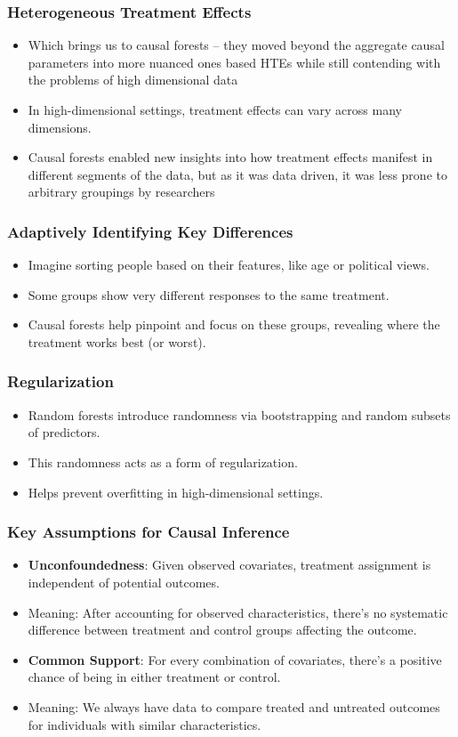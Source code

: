 \documentclass{beamer}
\begin{document}
\begin{frame}
\frametitle{Heterogeneous Treatment Effects}
\begin{itemize}
\item Which brings us to causal forests -- they moved beyond the aggregate causal parameters into more nuanced ones based HTEs while still contending with the problems of high dimensional data

    \item In high-dimensional settings, treatment effects can vary across many dimensions.
    \item Causal forests enabled new insights into how treatment effects manifest in different segments of the data, but as it was data driven, it was less prone to arbitrary groupings by researchers
\end{itemize}
\end{frame}

\begin{frame}
\frametitle{Adaptively Identifying Key Differences}
\begin{itemize}
    \item Imagine sorting people based on their features, like age or political views.
    \item Some groups show very different responses to the same treatment.
    \item Causal forests help pinpoint and focus on these groups, revealing where the treatment works best (or worst).
\end{itemize}
\end{frame}

\begin{frame}
\frametitle{Regularization}
\begin{itemize}
    \item Random forests introduce randomness via bootstrapping and random subsets of predictors.
    \item This randomness acts as a form of regularization.
    \item Helps prevent overfitting in high-dimensional settings.
\end{itemize}
\end{frame}

\begin{frame}
\frametitle{Key Assumptions for Causal Inference}
\begin{itemize}
\item \textbf{Unconfoundedness}: Given observed covariates, treatment assignment is independent of potential outcomes.
\item Meaning: After accounting for observed characteristics, there's no systematic difference between treatment and control groups affecting the outcome.
\item \textbf{Common Support}: For every combination of covariates, there's a positive chance of being in either treatment or control.
\item Meaning: We always have data to compare treated and untreated outcomes for individuals with similar characteristics.
\end{itemize}
\end{frame}
\end{document}
